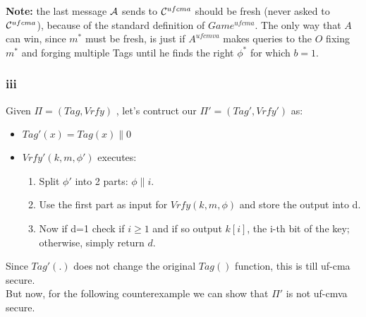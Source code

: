 \documentclass[11pt]{article}
\newcounter{t0d0_counter}
\begin{document}
\textbf{Note:} the last message $\mathcal{A}$ sends to $\mathcal{C}^{ufcma}$ should be fresh
(never asked to $\mathcal{C}^{ufcma}$), because of the standard definition of
$Game^{ufcma}$. The only way that $A$ can win, since $m^*$ must be fresh, is
just if $A^{ufcmva}$ makes queries to the $O$ fixing $m^*$ and forging multiple
Tags until he finds the right $\phi^*$ for which  $b=1$.  \newpage
\subsubsection{ iii }
Given $\Pi=(Tag, Vrfy)$ , let's contruct our $\Pi'=(Tag', Vrfy')$ as:
\begin{itemize}
   \item $Tag'(x)=Tag(x)\|0$
   \item $Vrfy'(k,m,\phi')$ executes:
   \begin{enumerate}
      \item Split $\phi'$ into 2 parts: $\phi \| i$.
      \item Use the first part as input for $Vrfy(k,m,\phi)$ and store the
          output into d.
      \item Now if d=1 check if $i \geq 1$ and if so output $k[i]$, the i-th
  bit of the key; otherwise, simply return $d$.
   \end{enumerate}
\end{itemize}

Since $Tag'(.)$ does not change the original $Tag()$ function, this is till uf-cma secure.\\
But now, for the following counterexample we can show that $\Pi'$ is not uf-cmva secure.

\begin{figure}[h!]
   \centering
   \sdinit{}
\end{figure}
\end{document}
